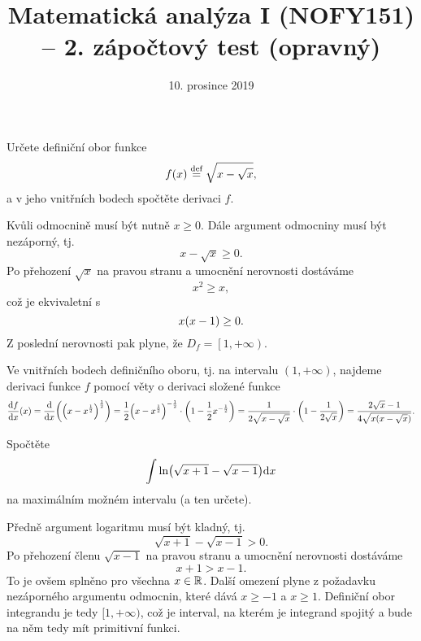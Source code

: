 \documentclass[answers]{exam}
\title{\vspace{-3ex}Matematická analýza I (NOFY151) – 2. zápočtový test (opravný)\vspace{-1ex}}
\author{\vspace{-2ex}}
\date{\vspace{-2ex}10. prosince 2019}
\begin{document}
\maketitle

\begin{questions}
  \question[2] Určete definiční obor funkce
  \begin{equation*}
    f(x) \stackrel{\text{def}}{=} \sqrt{x - \sqrt{x}},
  \end{equation*}
  a v jeho vnitřních bodech spočtěte derivaci $f$.
  
  \begin{solution}
    Kvůli  odmocnině musí být nutně $x \ge 0$. Dále argument  odmocniny musí být nezáporný, tj.
    \begin{equation*}
      x - \sqrt{x} \ge 0.
    \end{equation*}
    Po přehození $\sqrt{x}$ na pravou stranu a umocnění nerovnosti dostáváme
    \begin{equation*}
      x^2 \ge x,
    \end{equation*}
    což je ekvivaletní s
    \begin{equation*}
      x \parens{x - 1} \ge 0.
    \end{equation*}
    Z poslední nerovnosti pak plyne, že $D_f = \left[ 1, +\infty \right)$.
    
    Ve vnitřních bodech definičního oboru, tj. na intervalu $(1, +\infty)$, najdeme derivaci funkce $f$ pomocí věty o derivaci složené funkce
    \begin{equation*}
      \dd{f}{x}(x) 
      = 
      \dd{}{x} \parens{\parens{x - x^{\frac{1}{2}}}^{\frac{1}{2}}}
      =
      \frac{1}{2} \parens{x - x^{\frac{1}{2}}}^{-\frac{1}{2}} \cdot \parens{1 - \frac{1}{2} x^{-\frac{1}{2}}}
      =
      \frac{1}{2\sqrt{x - \sqrt{x}}} \cdot \parens{1 - \frac{1}{2 \sqrt{x}}}
      =
      \frac{2 \sqrt{x} - 1}{4 \sqrt{x\parens{x - \sqrt{x}}}}.
    \end{equation*}
  \end{solution}
  
  \question[4] Spočtěte
  \begin{equation*}
    \int \ln \parens{\sqrt{x + 1} - \sqrt{x - 1}} \diff x
  \end{equation*}
  na maximálním možném intervalu (a ten určete).
  
  \begin{solution}
    Předně argument logaritmu musí být kladný, tj.    
    \begin{equation*}
      \sqrt{x + 1} - \sqrt{x - 1} > 0.
    \end{equation*}
    Po přehození členu $\sqrt{x - 1}$ na pravou stranu a umocnění nerovnosti dostáváme
    \begin{equation*}
      x + 1 > x - 1.
    \end{equation*}
    To je ovšem splněno pro všechna $x \in \mathbb{R}$. Další omezení plyne z požadavku nezáporného argumentu odmocnin, které dává $x \ge -1$ a $x \ge 1$. Definiční obor integrandu je tedy $[1, +\infty)$, což je interval, na kterém je integrand spojitý a bude na něm tedy mít primitivní funkci.
    

\end{solution}
\end{questions}
\end{document}
